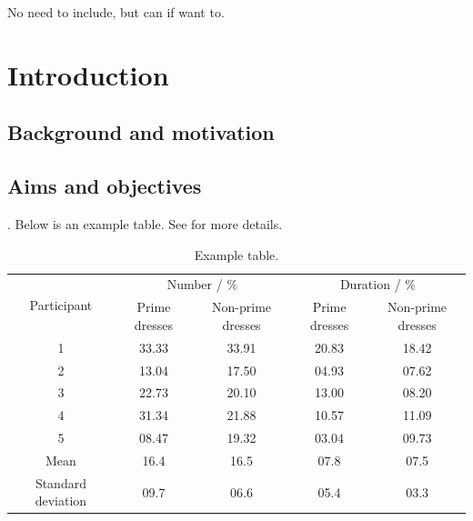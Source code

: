 \uomtoc


\begin{abstract} %
  This is abstract text. 
  
  \lipsum[1-2]
\end{abstract}%
\clearpage



\uomdeclarations %



\begin{uomacknowledgements}
No need to include, but can if want to.
\end{uomacknowledgements}



\section{Introduction}

  \subsection{Background and motivation}
  \lipsum[1-2] \cite{ref:jCAS09,ref:jCAS09a,ref:jCAS10} \lipsum[3-5]
  
  \subsection{Aims and objectives}
  \lipsum[6-7]. Below is an example table. See  for more details.
  \begin{table}
    \centering
    \caption{Example table.}
    \label{table:example_table}
    \begin{tabular}{ccccc}
      \toprule
      \multirow{2}{*}{Participant} & \multicolumn{2}{c}{Number / \%} & \multicolumn{2}{c}{Duration / \%} \\
                                   & Prime dresses & Non-prime dresses & Prime dresses & Non-prime dresses \\
	  \toprule
      1  & 33.33 & 33.91 & 20.83 & 18.42 \\
      2  & 13.04 & 17.50 & 04.93 & 07.62 \\
      3  & 22.73 & 20.10 & 13.00 & 08.20 \\
      4  & 31.34 & 21.88 & 10.57 & 11.09 \\
      5  & 08.47 & 19.32 & 03.04 & 09.73 \\
      \hline
      Mean & 16.4 & 16.5 & 07.8 & 07.5 \\
      Standard deviation & 09.7 & 06.6 & 05.4 & 03.3 \\
      \bottomrule
    \end{tabular}
  \end{table}  
  
